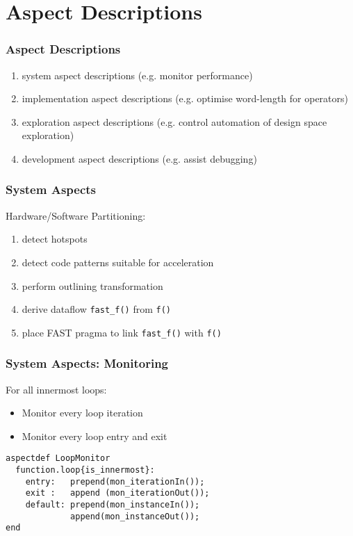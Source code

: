 \section{Aspect Descriptions}
\begin{frame}
  \frametitle{Aspect Descriptions}
\begin{enumerate}
  \item  system aspect descriptions (e.g. monitor performance)
  \item implementation aspect descriptions (e.g. optimise word-length for operators)
  \item exploration aspect descriptions (e.g. control automation of design space exploration)
  \item development aspect descriptions (e.g. assist debugging)
\end{enumerate}

\end{frame}


\begin{frame}
  \frametitle{System Aspects}
Hardware/Software Partitioning:
\begin{enumerate}
  \item detect hotspots
  \item detect code patterns suitable for acceleration
  \item perform outlining transformation
  \item derive dataflow \texttt{fast\_f()} from \texttt{f()}
  \item place FAST pragma to link \texttt{fast\_f()} with \texttt{f()}
\end{enumerate}
\end{frame}


\begin{frame}[fragile]
  \frametitle{System Aspects: Monitoring}
  For all innermost loops:
\begin{itemize}
  \item Monitor every loop iteration
  \item Monitor every loop entry and exit
\end{itemize}
\begin{lstlisting}[label=lst:label, style=lara]
aspectdef LoopMonitor
  function.loop{is_innermost}:
    entry:   prepend(mon_iterationIn());
    exit :   append (mon_iterationOut());
    default: prepend(mon_instanceIn());
             append(mon_instanceOut());
end
\end{lstlisting}
\end{frame}

